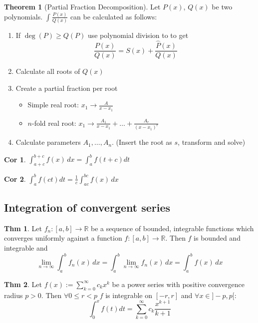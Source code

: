 \documentclass[a4paper, 10pt]{article}
\newtheorem*{corollary}{Cor}
\theoremstyle{definition}
\newtheorem*{theorem}{Thm}
\theoremstyle{named}
\newtheorem*{ntheorem_wrapper}{Theorem}
\newenvironment{ntheorem}%
    {\begin{mdframed}[style=important]\begin{ntheorem_wrapper}}%
    {\end{ntheorem_wrapper}\end{mdframed}}
\newcommand{\R}{\mathbb{R}}
\begin{document}
\begin{ntheorem}[Partial Fraction Decomposition]
    Let $P(x)$, $Q(x)$ be two polynomials. $\int \frac{P(x)}{Q(x)}$ can be calculated as follows:
    \begin{enumerate}
        \item If $\deg(P) \geq Q(P)$ use polynomial division to to get
        $$\frac{P(x)}{Q(x)} = S(x) + \frac{\hat{P}(x)}{Q(x)}$$
        \item Calculate all roots of $Q(x)$
        \item Create a partial fraction per root
        \begin{itemize}
            \item Simple real root: $x_1 \to \frac{A}{x - x_1}$
            \item $n$-fold real root: $x_1 \to \frac{A_1}{x - x_1} + \ldots + \frac{A_r}{(x - x_1)^r}$
        \end{itemize}
        \item Calculate parameters $A_1, \ldots, A_n$. (Insert the root as $s$, transform and solve)
    \end{enumerate}
\end{ntheorem}

\begin{corollary}
    $\int_{a + c}^{b + c} f(x) \,dx = \int_a^b f(t + c) dt$
\end{corollary}

\begin{corollary}
    $\int_a^b f(ct) dt = \frac{1}{c} \int_{ac}^{bc} f(x) \,dx$
\end{corollary}

\subsection{Integration of convergent series}
\begin{theorem}
    Let $f_n: [a, b] \to \R$ be a sequence of bounded, integrable functions which converges uniformly against a function $f: [a, b] \to \R$. Then $f$ is bounded and integrable and
    $$\lim_{n \to \infty} \int_a^b f_n(x) \,dx = \int_a^b \lim_{n \to \infty}  f_n(x) \,dx = \int_a^b f(x) \,dx$$
\end{theorem}

\begin{theorem}
    Let $f(x) := \sum_{k=0}^\infty c_k x^k$ be a power series with positive convergence radius $p > 0$. Then $\forall 0 \leq r < p$ $f$ is integrable on $[-r, r]$ and $\forall x \in ]-p, p[$:
    $$\int_0^x f(t) dt = \sum_{k=0}^\infty c_k \frac{x^{k + 1}}{k + 1}$$
\end{theorem}
\end{document}
